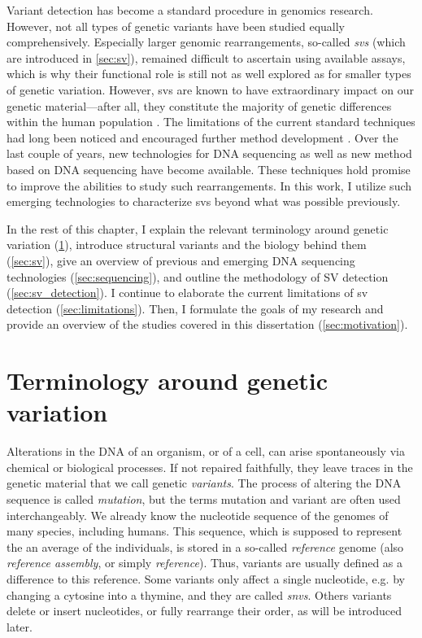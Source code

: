 Variant detection has become a standard procedure in genomics research. However,
not all types of genetic variants have been studied equally comprehensively.
Especially larger genomic rearrangements, so-called \emph{\aclp{sv}} (which are
introduced in \cref{sec:sv}), remained
difficult to ascertain using available assays, which is why their functional
role is still not as well explored as for smaller types of genetic variation.
However, \aclp{sv} are known to have extraordinary impact on our genetic
material---after all, they constitute the majority of genetic
differences within the human population \citep{Sudmant2015}.
The limitations of the current standard techniques had long been noticed and
encouraged further method development \citep{Onishi-Seebacher2011}. Over the
last couple of years, new technologies for DNA sequencing as well as new method
based on DNA sequencing have become available. These techniques hold promise to
improve the abilities to study such rearrangements. In this work, I utilize such
emerging technologies to characterize \aclp{sv} beyond what was possible previously.

In the rest of this chapter, I explain the relevant terminology around genetic
variation (\cref{sec:variation}), introduce structural variants and the biology
behind them (\cref{sec:sv}), give an overview of previous and emerging DNA
sequencing technologies (\cref{sec:sequencing}), and outline the methodology
of SV detection (\cref{sec:sv_detection}). I continue to elaborate the current
limitations of \acl{sv} detection (\cref{sec:limitations}). Then, I formulate
the goals of my research and provide an overview of the studies covered in this
dissertation (\cref{sec:motivation}).






\section{Terminology around genetic variation}
\label{sec:variation}

Alterations in the DNA of an organism, or of a cell, can arise spontaneously
via chemical or biological processes. If not repaired faithfully, they leave
traces in the genetic material that we call genetic \emph{variants}. The process
of altering the DNA sequence is called \emph{mutation}, but the terms mutation
and variant are often used interchangeably.
We already know the nucleotide sequence of the genomes of many species,
including humans. This sequence, which is supposed to represent the an average
of the individuals, is stored in a so-called \emph{reference} genome (also
\emph{reference assembly}, or simply \emph{reference}).
Thus, variants are usually defined as a difference to this reference. Some
variants only affect a single nucleotide, e.g. by changing a cytosine into a
thymine, and they are called \emph{\acfp{snv}}. Others variants delete or insert
nucleotides, or fully rearrange their order, as will be introduced later.

